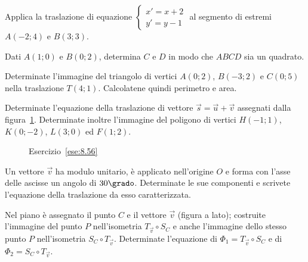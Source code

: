 \begin{esercizio}
	\label{ese:8.53} %
	Applica la traslazione di equazione 
	\(\begin{cases}x'=x+2\\y'=y-1\end{cases}\) al segmento di estremi 
	\(A(-2;4)\) e \(B(3;3)\). 
\end{esercizio}

\begin{esercizio}
	\label{ese:8.54} %
	Dati \(A(1;0)\) e \(B(0;2)\), determina \(C\) e \(D\) in modo che \(ABCD\) sia 
	un quadrato.
\end{esercizio}

\begin{esercizio}
	\label{ese:8.55} %
	Determinate l'immagine del triangolo di vertici \(A(0;2)\), \(B(-3;2)\) e 
	\(C(0;5)\) nella traslazione \(T(4;1)\). Calcolatene quindi perimetro e 
	area.
\end{esercizio}

\begin{esercizio}
	\label{ese:8.56} %
	Determinate l'equazione della traslazione di vettore 
	\(\vec{s}=\vec{u}+\vec{v}\) assegnati dalla figura~\ref{fig:ese8.56}. 
	Determinate inoltre l'immagine del poligono di vertici \(H(-1;1)\), 
	\(K(0;-2)\), \(L(3;0)\) ed \(F(1;2)\).
\end{esercizio}

\begin{inaccessibleblock}
	\begin{figure}[!htb]
		\centering
		\caption{Esercizio~\ref{ese:8.56}}\label{fig:ese8.56}
	\end{figure}
\end{inaccessibleblock}\vspace{8pt}

\begin{esercizio}
	\label{ese:8.57} %
	Un vettore \(\vec{v}\) ha modulo unitario, è applicato nell'origine \(O\) 
	e forma con l'asse delle ascisse un angolo di \(30\grado\). Determinate 
	le sue componenti e scrivete l'equazione della traslazione da esso 
	caratterizzata.
\end{esercizio}

\noindent\begin{minipage}{0.7\textwidth}\parindent15pt

\begin{esercizio}
	\label{ese:8.63} %
	Nel piano è assegnato il punto \(C\) e il vettore \(\vec{v}\) (figura a 
	lato); costruite l'immagine del punto \(P\) nell'isometria \(T_{\vec{v}} 
	\circ S_{C}\) e anche l'immagine dello stesso punto \(P\) nell'isometria 
	\(S_{C} \circ T_{\vec{v}}\). Determinate l'equazione di \(\Phi_1 = 
	T_{\vec{v}} \circ S_{C}\) e di \(\Phi_2 = S_{C} \circ T_{\vec{v}}\).
\end{esercizio}
\end{minipage}\hfil
\begin{minipage}{0.25\textwidth}
	\centering~~
\end{minipage}\vspace{8pt}

